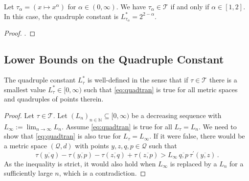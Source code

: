\documentclass{article}
\renewcommand{\subset}{\subseteq}
\newcommand*{\mc}[1]{\mathcal{#1}}
\newcommand{\N}{\mathbb{N}}
\newcommand{\Rp}{[0, \infty)} %
\newcommand{\Rpp}{(0, \infty)} %
\newcommand{\pr}{^\prime}
\newcommand{\equationFullstop}{\, .}
\newcommand{\eqfs}{\equationFullstop}
\newcommand{\ol}[2]{\overline{#1,#2}}
\newcommand{\tran}{\tau}
\newcommand{\Tran}{\mc{T}}
\newcommand{\dtran}{\tran\pr}
\newcommand{\ctransymbol}{L}
\newcommand{\ctrano}[1]{\ctransymbol_{#1}}
\newcommand{\ctranobest}[1]{\ctransymbol_{#1}^{*}}
\newcommand{\ctranbest}{\ctranobest{\tran}}
\newcommand{\ctran}{\ctrano{\tran}}
\begin{document}
%
\begin{proposition}\label{prp:powerinequ}
	Let $\tran_\alpha = (x\mapsto x^\alpha)$ for $\alpha\in\Rpp$. We have $\tran_\alpha\in\Tran$ if and only if $\alpha\in[1,2]$. In this case, the quadruple constant is $\ctranobest{\tran_\alpha} = 2^{2-\alpha}$.
\end{proposition}
%
\begin{proof}
	\cite[Theorem 3 and Appendix E]{schoetz19}.
\end{proof}
%
%
%
\subsection{Lower Bounds on the Quadruple Constant}
%
\begin{lemma}
	The quadruple constant $\ctranbest$ is well-defined in the sense that if $\tran\in\Tran$ there is a smallest value $\ctranbest\in\Rp$ such that \eqref{eq:quadtran} is true for all metric spaces and quadruples of points therein.
\end{lemma}
%
\begin{proof}
	Let $\tran\in\Tran$. Let $(\ctransymbol_n)_{n\in\N}\subset\Rp$ be a decreasing sequence with $\ctransymbol_\infty := \lim_{n\to\infty} \ctransymbol_n$. Assume \eqref{eq:quadtran} is true for all $\ctran = \ctransymbol_n$. We need to show that \eqref{eq:quadtran} is also true for $\ctran = \ctransymbol_\infty$. 
	If it were false, there would be a metric space $(\mc Q, d)$ with points $y,z,q,p\in\mc Q$ such that
	\begin{equation}
		\tran(\ol yq)  - \tran(\ol yp) - \tran(\ol zq) + \tran(\ol zp) > \ctransymbol_\infty\,  \ol qp \, \dtran(\ol yz)
		\eqfs
	\end{equation}
 	As the inequality is strict, it would also hold when $\ctransymbol_\infty$ is replaced by a $L_n$ for a sufficiently large $n$, which is a contradiction.
\end{proof}
%
\end{document}
